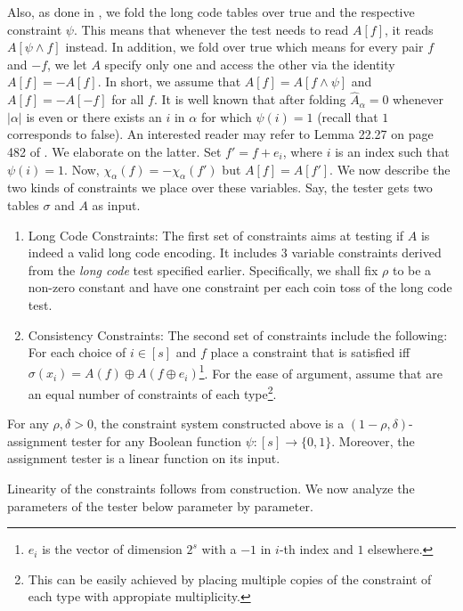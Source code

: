  
\noindent Also, as done in \cite{BGS}, we fold the long code tables
over true and the respective constraint $\psi$. This means that
whenever the test needs to read $A[f]$, it reads $A[\psi \wedge f]$
instead. In addition, we fold over true which means for every pair $f$
and $-f$, we let $A$ specify only one and access the other via the
identity $A[f] = - A[f]$. In short, we assume that $A[f] = A[f \wedge
\psi]$ and $A[f] =- A[-f]$ for all $f$. It is well known that after
folding $\hat{A}_\alpha = 0$ whenever $|\alpha|$ is even or there
exists an $i$ in $\alpha$ for which $\psi(i) = 1$ (recall that $1$
corresponds to false). An interested reader may refer to Lemma 22.27
on page 482 of \cite{AB}. We elaborate on the latter. Set $f' = f +
e_i$, where $i$ is an index such that $\psi(i) = 1$. Now,
$\chi_\alpha(f) = - \chi_\alpha(f')$ but $A[f] = A[f']$. We now
describe the two kinds of constraints we place over these
variables. Say, the tester gets two tables $\sigma$ and $A$ as input.

\begin{enumerate}
\item {\sf Long Code Constraints:} The first set of constraints aims
  at testing if $A$ is indeed a valid long code encoding. It includes
  $3$ variable constraints derived from the {\em long code} test
  specified earlier. Specifically, we shall fix $\rho$ to be a
  non-zero constant and have one constraint per each coin toss of the
  long code test.

\item {\sf Consistency Constraints:} The second set of constraints
  include the following: For each choice of $i \in [s]$ and $f$
  place a constraint that is satisfied iff $\sigma(x_i) = A(f) \oplus
  A(f \oplus e_i)$\footnote{$e_i$ is the vector of dimension $2^s$
    with a $-1$ in $i$-th index and $1$ elsewhere.}. For the ease of
  argument, assume that are an equal number of constraints of each
  type\footnote{This can be easily achieved by placing multiple copies
    of the constraint of each type with appropiate multiplicity.}.
\end{enumerate}

\begin{lemma} \label{Tester} For any $\rho, \delta
  > 0$, the constraint system constructed above is a $(1- \rho,
  \delta)$-assignment tester for any Boolean function $\psi : [s]
  \rightarrow \{0,1\}$. Moreover, the assignment tester is a linear
  function on its input.
\end{lemma}
 Linearity of the constraints follows from
construction. We now analyze the parameters of the tester below
parameter by parameter.

